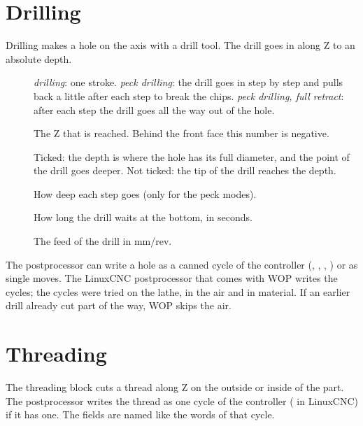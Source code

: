 \section{Drilling}\label{sec:blocks:drilling}


Drilling makes a hole on the axis with a drill tool. The drill goes in along Z to an absolute depth.

\begin{description}
\item[] \emph{drilling}: one stroke. \emph{peck drilling}: the drill goes in step by step and pulls back a little after each step to break the chips. \emph{peck drilling, full retract}: after each step the drill goes all the way out of the hole.
\item[] The Z that is reached. Behind the front face this number is negative.
\item[] Ticked: the depth is where the hole has its full diameter, and the point of the drill goes deeper. Not ticked: the tip of the drill reaches the depth.
\item[] How deep each step goes (only for the peck modes).
\item[] How long the drill waits at the bottom, in seconds.
\item[] The feed of the drill in mm/rev.
\end{description}

The postprocessor can write a hole as a canned cycle of the controller (, , , ) or as single moves. The LinuxCNC postprocessor that comes with WOP writes the cycles; the cycles were tried on the lathe, in the air and in material. If an earlier drill already cut part of the way, WOP skips the air.

\section{Threading}\label{sec:blocks:threading}


The threading block cuts a thread along Z on the outside or inside of the part. The postprocessor writes the thread as one cycle of the controller ( in LinuxCNC) if it has one. The fields are named like the words of that cycle.

